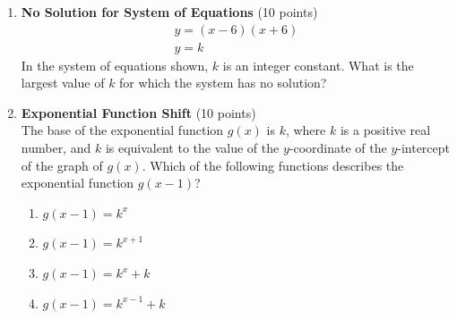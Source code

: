 \begin{enumerate}
  \item \textbf{No Solution for System of Equations} (10 points)\\
  \[
    \begin{gathered}
    y=(x-6)(x+6) \\
    y=k
    \end{gathered}
  \]
  In the system of equations shown, $k$ is an integer constant. What is the largest value of $k$ for which the system has no solution?
  \begin{subanswer}
  \end{subanswer}

  \item \textbf{Exponential Function Shift} (10 points)\\
  The base of the exponential function $g(x)$ is $k$, where $k$ is a positive real number, and $k$ is equivalent to the value of the $y$-coordinate of the $y$-intercept of the graph of $g(x)$. Which of the following functions describes the exponential function $g(x-1)$?
  \begin{enumerate}[label=\Alph*.]
    \item $g(x-1)=k^x$
    \item $g(x-1)=k^{x+1}$
    \item $g(x-1)=k^x+k$
    \item $g(x-1)=k^{x-1}+k$
  \end{enumerate}
  \begin{subanswer}
  \end{subanswer}

\end{enumerate}

